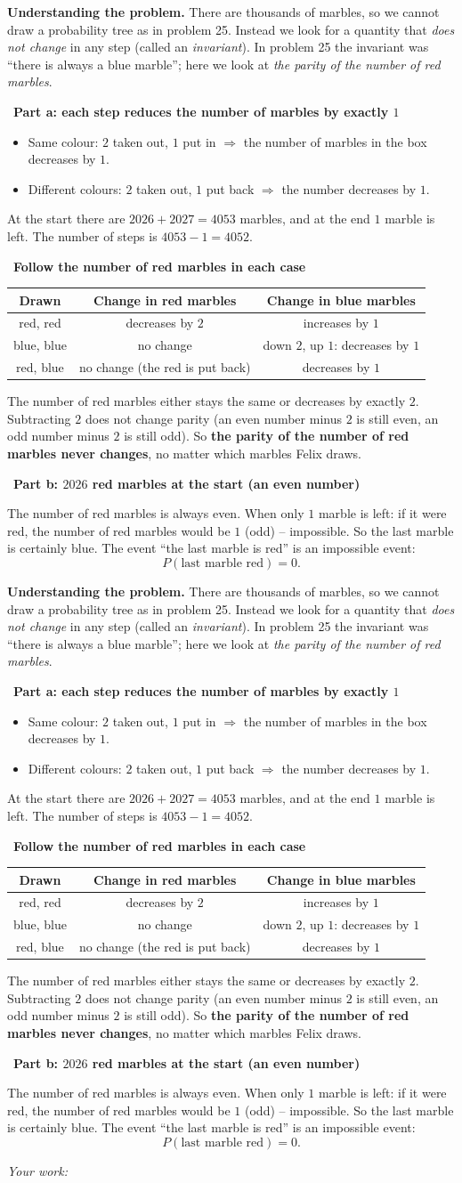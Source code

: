 \documentclass[11pt]{article}
\newif\ifsol \soltrue
\newcommand{\StuProb}[2]{\begin{probboxS}{#1}{#2}\StuProbBody\end{probboxS}}
\newcommand{\probsol}[1]{%
  \begin{lrbox}{\solmeasure}\begin{minipage}{\dimexpr\linewidth-24pt\relax}#1\end{minipage}\end{lrbox}%
  \ifsol
    \begin{solbox}#1\end{solbox}%
  \else
    \setlength{\solht}{\dimexpr\ht\solmeasure+\dp\solmeasure+0.85cm\relax}%
    \ifdim\solht<1.35cm\setlength{\solht}{1.35cm}\fi
    \ifdim\solht>\StudentMaxWork\setlength{\solht}{\StudentMaxWork}\fi
    \par\noindent\begin{minipage}{\linewidth}%
    \expandafter\StuProb\StuProbArgs
    \begin{tcolorbox}[colback=white,colframe=Line,boxrule=0.8pt,arc=5pt,
      left=8pt,right=8pt,top=4pt,bottom=4pt,height=\solht]{\footnotesize\color{Slate}\itshape\WorkWord}\end{tcolorbox}%
    \end{minipage}\par\medskip
  \fi}
\newlength{\StudentMaxWork}\setlength{\StudentMaxWork}{4.5cm}
\newcommand{\step}[2]{\par\smallskip\noindent{\bfseries\color{tmBlue!85!black}\StepWord~#1.}\ {\bfseries #2}\par\nopagebreak}
\def\WorkWord{Your work:}
\def\StepWord{Step}
\begin{document}
\probsol{
\textbf{Understanding the problem.} There are thousands of marbles, so we cannot draw a probability tree as in problem 25. Instead we look for
a quantity that \emph{does not change} in any step (called an \emph{invariant}). In problem 25 the invariant was ``there is always a blue
marble''; here we look at \emph{the parity of the number of red marbles}.

\step{1}{Part a: each step reduces the number of marbles by exactly $1$}
\begin{itemize}[leftmargin=1.2em,itemsep=1pt,topsep=2pt]
\item Same colour: $2$ taken out, $1$ put in $\Rightarrow$ the number of marbles in the box decreases by $1$.
\item Different colours: $2$ taken out, $1$ put back $\Rightarrow$ the number decreases by $1$.
\end{itemize}
At the start there are $2026+2027=4053$ marbles, and at the end $1$ marble is left. The number of steps is $4053-1=4052$.

\step{2}{Follow the number of red marbles in each case}
\begin{center}\begin{tabular}{|c|c|c|}\hline
Drawn & Change in red marbles & Change in blue marbles\\\hline
red, red & decreases by $2$ & increases by $1$\\\hline
blue, blue & no change & down $2$, up $1$: decreases by $1$\\\hline
red, blue & no change (the red is put back) & decreases by $1$\\\hline
\end{tabular}\end{center}
\begin{proofbox}The number of red marbles either stays the same or decreases by exactly $2$. Subtracting $2$ does not change parity (an even
number minus $2$ is still even, an odd number minus $2$ is still odd). So \textbf{the parity of the number of red marbles never changes}, no
matter which marbles Felix draws.\end{proofbox}

\step{3}{Part b: $2026$ red marbles at the start (an even number)}
The number of red marbles is always even. When only $1$ marble is left: if it were red, the number of red marbles would be $1$ (odd) --
impossible. So the last marble is certainly blue. The event ``the last marble is red'' is an impossible event:
\[P(\text{last marble red})=0.\]

}
\end{document}
